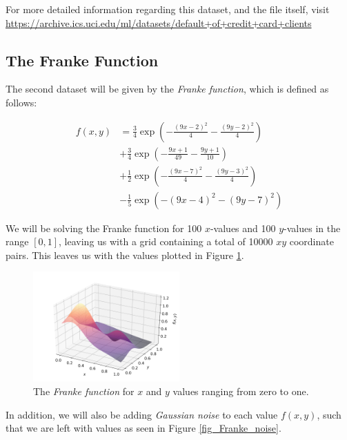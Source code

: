 \documentclass[a4paper,10pt,english]{article}
\begin{document}
\begin{multicols*}{2}
For more detailed information regarding this dataset, and the file itself, visit \url{https://archive.ics.uci.edu/ml/datasets/default+of+credit+card+clients}

\subsection*{The Franke Function}

The second dataset will be given by the \textit{Franke function}, which is defined as follows:

\begin{align*}
f(x,y) &= \frac{3}{4} \exp \left( -\frac{(9x-2)^2}{4} -\frac{(9y-2)^2}{4} \right) \\ &+ \frac{3}{4} \exp \left( -\frac{9x+1}{49} -\frac{9y+1}{10} \right) \\ &+ \frac{1}{2} \exp \left( -\frac{(9x-7)^2}{4} -\frac{(9y-3)^2}{4} \right) \\ &- \frac{1}{5} \exp \left( -(9x-4)^2 - (9y-7)^2 \right)
\end{align*}

We will be solving the Franke function for 100 $x$-values and 100 $y$-values in the range $[0,1]$, leaving us with a grid containing a total of 10000 $xy$ coordinate pairs.  This leaves us with the values plotted in Figure \ref{fig_Franke}.

\begin{figure}[H]
	\centering
	\includegraphics[width = 0.5\textwidth, center]{Franke.png}
	\caption{The \textit{Franke function} for $x$ and $y$ values ranging from zero to one. \label{fig_Franke}}
\end{figure}

In addition, we will also be adding \textit{Gaussian noise} to each value $f(x,y)$, such that we are left with values as seen in Figure \ref{fig_Franke_noise}. %


\end{multicols*}
\end{document}

